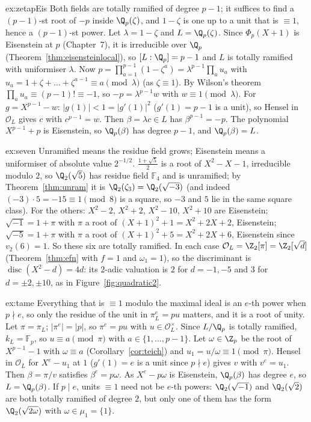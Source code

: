 \begin{solution}{ex:zetapEis}
\idea Both fields are totally ramified of degree $p-1$; it suffices to find a $(p-1)$-st root of $-p$ inside $\Q_p(\zeta)$,
and $1-\zeta$ is one up to a unit that is $\equiv1$, hence a $(p-1)$-st power.
\writeup Let $\lambda=1-\zeta$ and $L=\Q_p(\zeta)$. Since $\Phi_p(X+1)$ is Eisenstein at $p$ (Chapter~7), it is irreducible over
$\Q_p$ (Theorem~\ref{thm:eisensteinlocal}), so $[L:\Q_p]=p-1$ and $L$ is totally ramified with uniformiser $\lambda$. Now
$p=\prod_{a=1}^{p-1}(1-\zeta^a)=\lambda^{p-1}\prod_au_a$ with $u_a=1+\zeta+\dots+\zeta^{a-1}\equiv a\pmod\lambda$ (as $\zeta\equiv1$).
By Wilson's theorem $\prod_au_a\equiv(p-1)!\equiv-1$, so $-p=\lambda^{p-1}w$ with $w\equiv1\pmod\lambda$. For $g=X^{p-1}-w$:
$|g(1)|<1=|g'(1)|^2$ ($g'(1)=p-1$ is a unit), so Hensel in $\mathcal O_L$ gives $c$ with $c^{p-1}=w$. Then $\beta=\lambda c\in L$ has
$\beta^{p-1}=-p$. The polynomial $X^{p-1}+p$ is Eisenstein, so $\Q_p(\beta)$ has degree $p-1$, and $\Q_p(\beta)=L$.
\end{solution}

\begin{solution}{ex:seven}
\idea Unramified means the residue field grows; Eisenstein means a uniformiser of absolute value $2^{-1/2}$.
\writeup $\frac{1+\sqrt5}2$ is a root of $X^2-X-1$, irreducible modulo $2$, so $\Q_2(\sqrt5)$ has residue field $\mathbb F_4$ and is
unramified; by Theorem~\ref{thm:unram} it is $\Q_2(\zeta_3)=\Q_2(\sqrt{-3})$ (and indeed $(-3)\cdot5=-15\equiv1\pmod8$ is a square, so
$-3$ and $5$ lie in the same square class).
For the others: $X^2-2$, $X^2+2$, $X^2-10$, $X^2+10$ are Eisenstein; $\sqrt{-1}=1+\pi$ with $\pi$ a root of $(X+1)^2+1=X^2+2X+2$,
Eisenstein; $\sqrt{-5}=1+\pi$ with $\pi$ a root of $(X+1)^2+5=X^2+2X+6$, Eisenstein since $v_2(6)=1$. So these six are totally
ramified. In each case $\mathcal O_L=\Z_2[\pi]=\Z_2[\sqrt d]$ (Theorem~\ref{thm:efn} with $f=1$ and $\omega_1=1$), so the
discriminant is $\operatorname{disc}(X^2-d)=4d$: its $2$-adic valuation is $2$ for $d=-1,-5$ and $3$ for $d=\pm2,\pm10$, as in
Figure~\ref{fig:quadratic2}.
\end{solution}

\begin{solution}{ex:tame}
\idea Everything that is $\equiv1$ modulo the maximal ideal is an $e$-th power when $p\nmid e$, so only the residue of the unit
in $\pi_L^e=pu$ matters, and it is a root of unity.
\writeup Let $\pi=\pi_L$; $|\pi^e|=|p|$, so $\pi^e=pu$ with $u\in\mathcal O_L^\times$. Since $L/\Q_p$ is totally ramified, $k_L=\mathbb F_p$,
so $u\equiv a\pmod\pi$ with $a\in\{1,\dots,p-1\}$. Let $\omega\in\Z_p$ be the root of $X^{p-1}-1$ with $\omega\equiv a$ (Corollary~\ref{cor:teich}) and $u_1=u/\omega\equiv1\pmod\pi$. Hensel in $\mathcal O_L$ for $X^e-u_1$ at $1$ ($g'(1)=e$ is a unit since $p\nmid e$)
gives $v$ with $v^e=u_1$. Then $\beta=\pi/v$ satisfies $\beta^e=p\omega$. As $X^e-p\omega$ is Eisenstein, $\Q_p(\beta)$ has degree $e$,
so $L=\Q_p(\beta)$. If $p\mid e$, units $\equiv1$ need not be $e$-th powers: $\Q_2(\sqrt{-1})$ and $\Q_2(\sqrt2)$ are both totally
ramified of degree $2$, but only one of them has the form $\Q_2(\sqrt{2\omega})$ with $\omega\in\mu_1=\{1\}$.
\end{solution}

